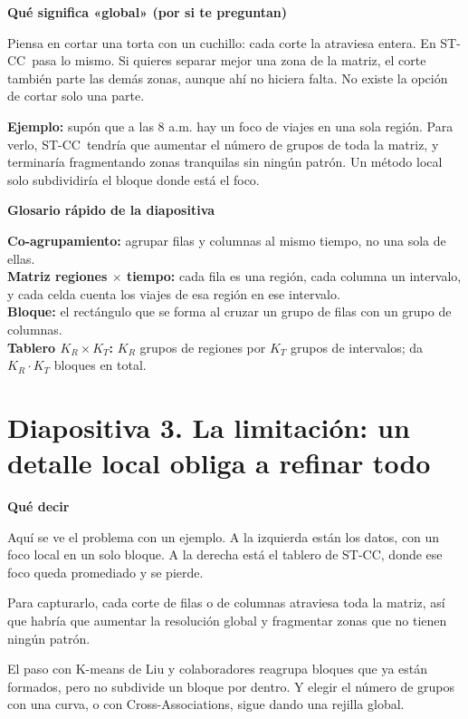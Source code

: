 \documentclass[11pt,a4paper]{article}
\newcommand{\cajainicio}[3]{\par\medskip\noindent
  \begin{lrbox}{\cajabox}\begin{minipage}{\dimexpr\linewidth-2\fboxsep-2\fboxrule\relax}%
  \textbf{\color{#1}#3}\par\smallskip}
\newcommand{\cajafin}[2]{\end{minipage}\end{lrbox}\fcolorbox{#1}{#2}{\usebox{\cajabox}}\par\medskip}
\newenvironment{guion}{\cajainicio{ucspblue}{ucspblue!6}{Qué decir}}{\cajafin{ucspblue}{ucspblue!6}}
\newenvironment{nota}[1]{\cajainicio{acc}{acc!7}{#1}}{\cajafin{acc}{acc!7}}
\newcommand{\STCC}{ST-CC}
\begin{document}
\begin{nota}{Qué significa «global» (por si te preguntan)}
Piensa en cortar una torta con un cuchillo: cada corte la atraviesa entera. En \STCC\ pasa lo mismo. Si quieres separar mejor una zona de la matriz, el corte también parte las demás zonas, aunque ahí no hiciera falta. No existe la opción de cortar solo una parte.

\textbf{Ejemplo:} supón que a las 8 a.m. hay un foco de viajes en una sola región. Para verlo, \STCC\ tendría que aumentar el número de grupos de toda la matriz, y terminaría fragmentando zonas tranquilas sin ningún patrón. Un método local solo subdividiría el bloque donde está el foco.
\end{nota}

\begin{nota}{Glosario rápido de la diapositiva}
\textbf{Co-agrupamiento:} agrupar filas y columnas al mismo tiempo, no una sola de ellas.\\
\textbf{Matriz regiones $\times$ tiempo:} cada fila es una región, cada columna un intervalo, y cada celda cuenta los viajes de esa región en ese intervalo.\\
\textbf{Bloque:} el rectángulo que se forma al cruzar un grupo de filas con un grupo de columnas.\\
\textbf{Tablero $K_R\times K_T$:} $K_R$ grupos de regiones por $K_T$ grupos de intervalos; da $K_R\cdot K_T$ bloques en total.
\end{nota}

\newpage
\section*{Diapositiva 3. La limitación: un detalle local obliga a refinar todo}

\begin{guion}
Aquí se ve el problema con un ejemplo. A la izquierda están los datos, con un foco local en un solo bloque. A la derecha está el tablero de \STCC, donde ese foco queda promediado y se pierde.

Para capturarlo, cada corte de filas o de columnas atraviesa toda la matriz, así que habría que aumentar la resolución global y fragmentar zonas que no tienen ningún patrón.

El paso con K-means de Liu y colaboradores reagrupa bloques que ya están formados, pero no subdivide un bloque por dentro. Y elegir el número de grupos con una curva, o con Cross-Associations, sigue dando una rejilla global.
\end{guion}
\end{document}
